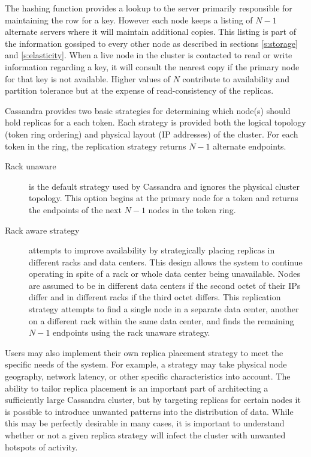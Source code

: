 \documentclass[twocolumn]{article}
\begin{document}
The hashing function provides a lookup to the server primarily responsible for maintaining the row for a key.  However each node keeps a listing of $N-1$ alternate servers where it will maintain additional copies.  This listing is part of the information gossiped to every other node as described in sections \ref{s:storage} and \ref{s:elasticity}. When a live node in the cluster is contacted to read or write information regarding a key, it will consult the nearest copy if the primary node for that key is not available.  Higher values of $N$ contribute to availability and partition tolerance but at the expense of read-consistency of the replicas.

Cassandra provides two basic strategies for determining which node(s) should hold replicas for a each token. Each strategy is provided both the logical topology (token ring ordering) and physical layout (IP addresses) of the cluster.  For each token in the ring, the replication strategy returns $N-1$ alternate endpoints.

\begin{description}
  \item[Rack unaware] is the default strategy used by Cassandra and ignores the physical cluster topology.  This option begins at the primary node for a token and returns the endpoints of the next $N-1$ nodes in the token ring.
  \item[Rack aware strategy] attempts to improve availability by strategically placing replicas in different racks and data centers.  This design allows the system to continue operating in spite of a rack or whole data center being unavailable.  Nodes are assumed to be in different data centers if the second octet of their IPs differ and in different racks if the third octet differs.  This replication strategy attempts to find a single node in a separate data center, another on a different rack within the same data center, and finds the remaining $N-1$ endpoints using the rack unaware strategy. 
\end{description}

Users may also implement their own replica placement strategy to meet the specific needs of the system.  For example, a strategy may take physical node geography, network latency, or other specific characteristics into account.  The ability to tailor replica placement is an important part of architecting a sufficiently large Cassandra cluster, but by targeting replicas for certain nodes it is possible to introduce unwanted patterns into the distribution of data.  While this may be perfectly desirable in many cases, it is important to understand whether or not a given replica strategy will infect the cluster with unwanted hotspots of activity.
\end{document}
